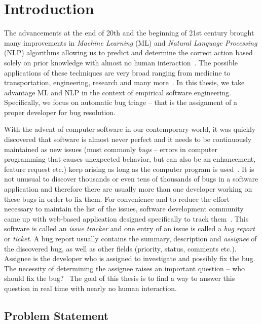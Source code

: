 \chapter{Introduction}

The advancements at the end of 20th and the beginning of 21st century brought many improvements in \textit{Machine Learning} (ML) and \textit{Natural Language Processing} (NLP) algorithms allowing us to predict and determine the correct action based solely on prior knowledge with almost no human interaction~\cite{carbonell1983overview}. The possible applications of these techniques are very broad ranging from medicine to transportation, engineering, research and many more~\cite{kononenko2001machine}\cite{nguyen1990neural}. In this thesis, we take advantage ML and NLP in the context of empirical software engineering. Specifically, we focus on automatic bug triage -- that is the assignment of a proper developer for bug resolution.

With the advent of computer software in our contemporary world, it was quickly discovered that software is almost never perfect and it needs to be continuously maintained as new issues (most commonly \textit{bugs} -- errors in computer programming that causes unexpected behavior, but can also be an enhancement, feature request etc.) keep arising as long as the computer program is used~\cite{nist2002}. It is not unusual to discover thousands or even tens of thousands of bugs in a software application and therefore there are usually more than one developer working on these bugs in order to fix them. For convenience and to reduce the effort necessary to maintain the list of the issues, software development community came up with web-based application designed specifically to track them~\cite{bertram2010communication}. This software is called an \textit{issue tracker} and one entry of an issue is called a \textit{bug report} or \textit{ticket}. A bug report usually contains the summary, description and \textit{assignee} of the discovered bug, as well as other fields (priority, status, comments etc.). Assignee is the developer who is assigned to investigate and possibly fix the bug. The necessity of determining the assignee raises an important question -- who should fix the bug?~\cite{Anvik2006} The goal of this thesis is to find a way to answer this question in real time with nearly no human interaction.

\section{Problem Statement}


